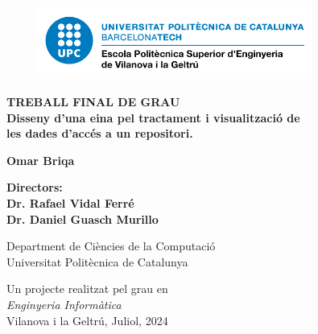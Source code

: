 \begin{titlepage}
    \begin{center}

        \begin{figure}[t!]
            \centering
            \vspace*{-5\baselineskip}
            \includegraphics[width=0.8\textwidth]{fig/epsevg-logo}
            \vspace*{-2\baselineskip}
        \end{figure}

        \huge
        \vspace*{0.5cm}
        \textbf{TREBALL FINAL DE GRAU\\}
        \vspace*{2cm}
        \textbf{Disseny d'una eina pel tractament i visualització de\\ les dades d'accés a un repositori.}
        \vspace*{1cm}

        \huge
        \textbf{Omar Briqa}
        \vfill

        \LARGE
        \textbf{Directors:\\}
        \vspace*{0.2cm}
        \textbf{Dr. Rafael Vidal Ferré\\Dr. Daniel Guasch Murillo\\}
        \vfill

        \Large
        Department de Ciències de la Computació\\
        Universitat Politècnica de Catalunya\\
        \vspace*{1cm}

        Un projecte realitzat pel grau en\\
        {\textit{Enginyeria Informàtica}\\}
        Vilanova i la Geltrú, Juliol, 2024


             
    \end{center}
 \end{titlepage}